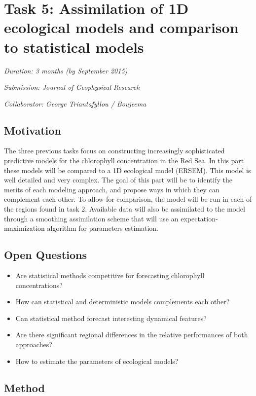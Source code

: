 \section{Task 5: Assimilation of 1D ecological models and comparison to statistical models}

\noindent
\emph{Duration: 3 months (by September 2015)}

\noindent
\emph{Submission: Journal of Geophysical Research}

\noindent
\emph{Collaborator: George Triantafyllou / Boujeema}

\subsection{Motivation}

The three previous tasks focus on constructing increasingly sophisticated predictive models for the chlorophyll concentration in the Red Sea. In this part these models will be compared to a 1D ecological model (ERSEM). This model is well detailed and very complex. The goal of this part will be to identify the merits of each modeling approach, and propose ways in which they can complement each other. To allow for comparison, the model will be run in each of the regions found in task 2. Available data will also be assimilated to the model through a smoothing assimilation scheme that will use an expectation-maximization algorithm for parameters estimation. 

\subsection{Open Questions}

\begin{itemize}
\item Are statistical methods competitive for forecasting chlorophyll concentrations?
\item How can statistical and deterministic models complements each other?
\item Can statistical method forecast interesting dynamical features?
\item Are there significant regional differences in the relative performances of both approaches?
\item How to estimate the parameters of ecological models? 
\end{itemize}

\subsection{Method}

